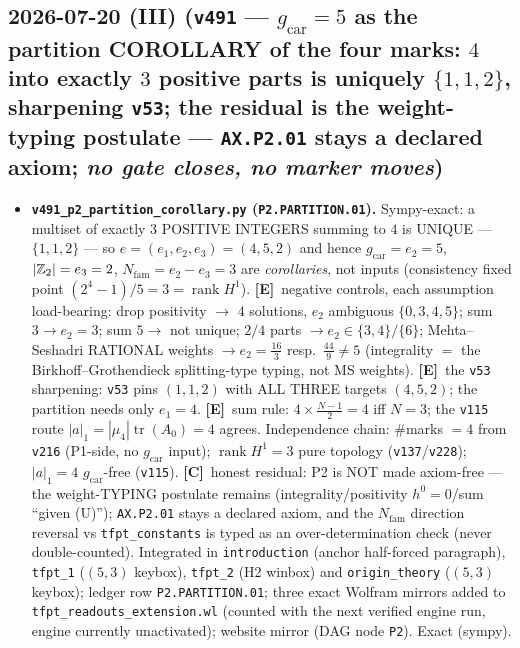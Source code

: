 \documentclass[11pt]{article}
\providecommand{\mE}{\textbf{[E]}}\providecommand{\mC}{\textbf{[C]}}
\providecommand{\gcar}{g_{\mathrm{car}}}\providecommand{\Nfam}{N_{\mathrm{fam}}}
\begin{document}
\subsection*{2026-07-20 (III) (\texttt{v491} --- $\gcar{=}5$ as the partition COROLLARY of the four marks: $4$ into exactly $3$ positive parts is uniquely $\{1,1,2\}$, sharpening \texttt{v53}; the residual is the weight-typing postulate --- \texttt{AX.P2.01} stays a declared axiom; \emph{no gate closes, no marker moves})}
\begin{itemize}[leftmargin=1.5em]
\item \textbf{\texttt{v491\_p2\_partition\_corollary.py} (\texttt{P2.PARTITION.01}).} Sympy-exact: a
multiset of exactly $3$ POSITIVE INTEGERS summing to $4$ is UNIQUE --- $\{1,1,2\}$ --- so
$e=(e_1,e_2,e_3)=(4,5,2)$ and hence $\gcar=e_2=5$, $|\mathbb{Z}_2|=e_3=2$, $\Nfam=e_2{-}e_3=3$ are
\emph{corollaries}, not inputs (consistency fixed point $(2^4{-}1)/5=3=\operatorname{rank}H^1$).
\mE\ negative controls, each assumption load-bearing: drop positivity $\to$ $4$ solutions, $e_2$
ambiguous $\{0,3,4,5\}$; sum $3\to e_2{=}3$; sum $5\to$ not unique; $2/4$ parts $\to e_2\in\{3,4\}/\{6\}$;
Mehta--Seshadri RATIONAL weights $\to e_2=\tfrac{16}3$ resp.\ $\tfrac{44}9\neq5$ (integrality $=$ the
Birkhoff--Grothendieck splitting-type typing, not MS weights). \mE\ the \texttt{v53} sharpening:
\texttt{v53} pins $(1,1,2)$ with ALL THREE targets $(4,5,2)$; the partition needs only $e_1{=}4$.
\mE\ sum rule: $4\times\tfrac{N-1}2=4$ iff $N{=}3$; the \texttt{v115} route
$|a|_1=|\mu_4|\operatorname{tr}(A_0)=4$ agrees. Independence chain: $\#$marks $=4$ from \texttt{v216}
(P1-side, no $\gcar$ input); $\operatorname{rank}H^1=3$ pure topology (\texttt{v137}/\texttt{v228});
$|a|_1=4$ $\gcar$-free (\texttt{v115}). \mC\ honest residual: P2 is NOT made axiom-free --- the
weight-TYPING postulate remains (integrality/positivity $h^0{=}0$/sum ``given (U)'');
\texttt{AX.P2.01} stays a declared axiom, and the $\Nfam$ direction reversal vs
\texttt{tfpt\_constants} is typed as an over-determination check (never double-counted). Integrated in
\texttt{introduction} (anchor half-forced paragraph), \texttt{tfpt\_1} ($(5,3)$ keybox),
\texttt{tfpt\_2} (H2 winbox) and \texttt{origin\_theory} ($(5,3)$ keybox); ledger row
\texttt{P2.PARTITION.01}; three exact Wolfram mirrors added to
\texttt{tfpt\_readouts\_extension.wl} (counted with the next verified engine run, engine currently
unactivated); website mirror (DAG node \texttt{P2}). Exact (sympy).
\end{itemize}
\end{document}
